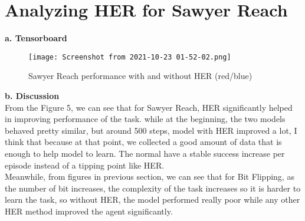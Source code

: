 \documentclass[]{article}
\begin{document}
	\section{Analyzing HER for Sawyer Reach}
	\textbf{a. Tensorboard} \\
	\begin{center} 
		\begin{figure}[H]
			\centering
			\texttt{[image: Screenshot from 2021-10-23 01-52-02.png]}
			\caption{Sawyer Reach performance with and without HER (red/blue)}
		\end{figure}
	\end{center}
	\textbf{b. Discussion} \\
	From the Figure 5, we can see that for Sawyer Reach, HER significantly helped in improving performance of the task. while at the beginning, the two models behaved pretty similar, but around 500 steps, model with HER improved a lot, I think that because at that point, we collected a good amount of data that is enough to help model to learn. The normal have a stable success increase per episode instead of a tipping point like HER. \\
	Meanwhile, from figures in previous section, we can see that for Bit Flipping, as the number of bit increases, the complexity of the task increases so it is harder to learn the task, so without HER, the model performed really poor while any other HER method improved the agent significantly.
\end{document}
